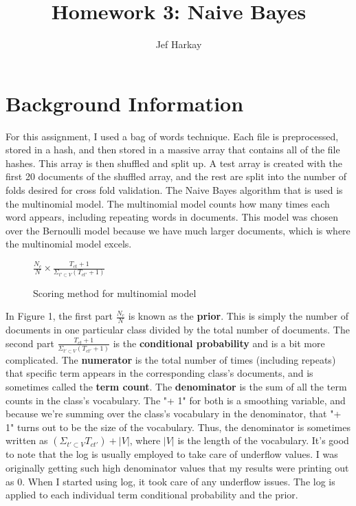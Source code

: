\documentclass[11pt]{article}
\title{Homework 3: Naive Bayes}
\author{Jef Harkay}
\begin{document}
\maketitle
\newpage
\section{Background Information}
For this assignment, I used a bag of words technique.  Each file is preprocessed, stored in a hash, and then stored in a massive array that contains all of the file hashes.  This array is then shuffled and split up.  A test array is created with the first 20 documents of the shuffled array, and the rest are split into the number of folds desired for cross fold validation.
\newline\newline
The Naive Bayes algorithm that is used is the multinomial model.  The multinomial model counts how many times each word appears, including repeating words in documents.  This model was chosen over the Bernoulli model because we have much larger documents, which is where the multinomial model excels.
\newline\newline
\begin{figure}[ht]
\begin{center}
\Large$\frac{N_{c}}{N} \times \frac{T_{ct} + 1}{\Sigma_{t'\subset V}(T_{ct'}+1)}$
\caption{Scoring method for multinomial model}
\end{center}
\end{figure}
\newline\newline
In Figure 1, the first part $\frac{N_{c}}{N}$ is known as the {\bf prior}.  This is simply the number of documents in one particular class divided by the total number of documents.
\newline\newline
The second part $\frac{T_{ct} + 1}{\Sigma_{t'\subset V}(T_{ct'}+1)}$ is the {\bf conditional probability} and is a bit more complicated.  The {\bf numerator} is the total number of times (including repeats) that specific term appears in the corresponding class's documents, and is sometimes called the {\bf term count}.  The {\bf denominator} is the sum of all the term counts in the class's vocabulary.
\newline\newline
The "+ 1" for both is a smoothing variable, and because we're summing over the class's vocabulary in the denominator, that "+ 1" turns out to be the size of the vocabulary.  Thus, the denominator is sometimes written as $(\Sigma_{t'\subset V} T_{ct'}) + |V|$, where $|V|$ is the length of the vocabulary.
\newline\newline
It's good to note that the log is usually employed to take care of underflow values.  I was originally getting such high denominator values that my results were printing out as 0.  When I started using log, it took care of any underflow issues.  The log is applied to each individual term conditional probability and the prior.
\newpage
\end{document}
